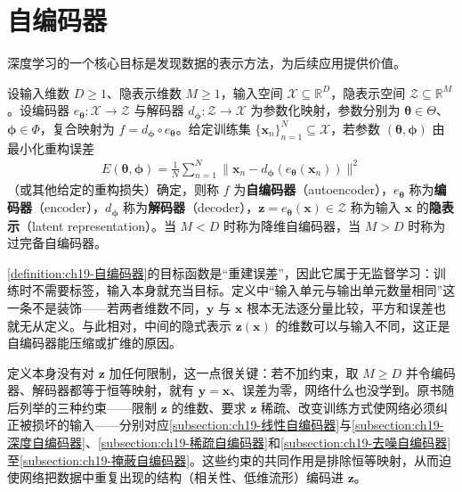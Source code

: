 \documentclass[../main.tex]{subfiles}
\begin{document}
\chapter{自编码器}\label{chapter:ch19-自编码器}

深度学习的一个核心目标是发现数据的表示方法，为后续应用提供价值。

\begin{definition}[自编码器]\label{definition:ch19-自编码器}
设输入维数 $D\geqslant1$、隐表示维数 $M\geqslant1$，输入空间 $\mathcal{X}\subseteq\mathbb{R}^{D}$，隐表示空间 $\mathcal{Z}\subseteq\mathbb{R}^{M}$。设编码器 $e_{\boldsymbol{\theta}}:\mathcal{X}\to\mathcal{Z}$ 与解码器 $d_{\boldsymbol{\phi}}:\mathcal{Z}\to\mathcal{X}$ 为参数化映射，参数分别为 $\boldsymbol{\theta}\in\Theta$、$\boldsymbol{\phi}\in\Phi$，复合映射为 $f=d_{\boldsymbol{\phi}}\circ e_{\boldsymbol{\theta}}$。给定训练集 $\{\bm{x}_n\}_{n=1}^{N}\subseteq\mathcal{X}$，若参数 $(\boldsymbol{\theta},\boldsymbol{\phi})$ 由最小化重构误差
\begin{align*}
  E(\boldsymbol{\theta},\boldsymbol{\phi})=\frac{1}{N}\sum_{n=1}^{N}\bigl\|\bm{x}_n-d_{\boldsymbol{\phi}}(e_{\boldsymbol{\theta}}(\bm{x}_n))\bigr\|^{2}
\end{align*}
（或其他给定的重构损失）确定，则称 $f$ 为\textbf{自编码器}（autoencoder），$e_{\boldsymbol{\theta}}$ 称为\textbf{编码器}（encoder），$d_{\boldsymbol{\phi}}$ 称为\textbf{解码器}（decoder），$\bm{z}=e_{\boldsymbol{\theta}}(\bm{x})\in\mathcal{Z}$ 称为输入 $\bm{x}$ 的\textbf{隐表示}（latent representation）。当 $M<D$ 时称为降维自编码器，当 $M>D$ 时称为过完备自编码器。
\end{definition}

\begin{remark}
\cref{definition:ch19-自编码器}的目标函数是“重建误差”，因此它属于无监督学习：训练时不需要标签，输入本身就充当目标。定义中“输入单元与输出单元数量相同”这一条不是装饰——若两者维数不同，$\bm{y}$ 与 $\bm{x}$ 根本无法逐分量比较，平方和误差也就无从定义。与此相对，中间的隐式表示 $\bm{z}(\bm{x})$ 的维数可以与输入不同，这正是自编码器能压缩或扩维的原因。

定义本身没有对 $\bm{z}$ 加任何限制，这一点很关键：若不加约束，取 $M\geqslant D$ 并令编码器、解码器都等于恒等映射，就有 $\bm{y}=\bm{x}$、误差为零，网络什么也没学到。原书随后列举的三种约束——限制 $\bm{z}$ 的维数、要求 $\bm{z}$ 稀疏、改变训练方式使网络必须纠正被损坏的输入——分别对应\cref{subsection:ch19-线性自编码器}与\cref{subsection:ch19-深度自编码器}、\cref{subsection:ch19-稀疏自编码器}和\cref{subsection:ch19-去噪自编码器}至\cref{subsection:ch19-掩蔽自编码器}。这些约束的共同作用是排除恒等映射，从而迫使网络把数据中重复出现的结构（相关性、低维流形）编码进 $\bm{z}$。
\end{remark}
\end{document}
